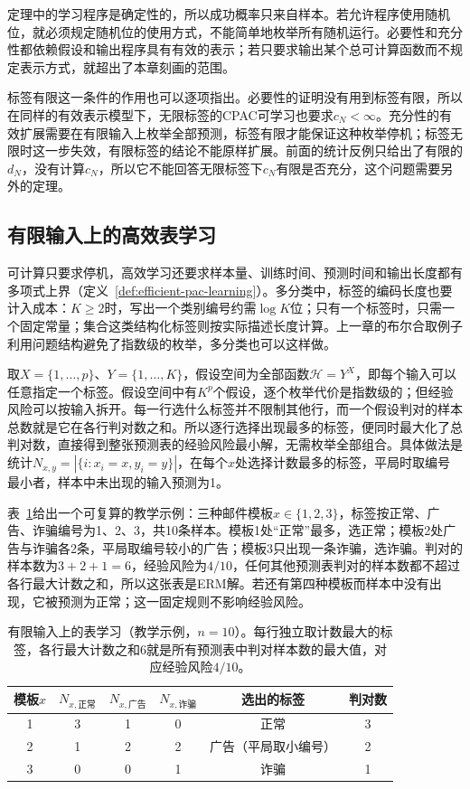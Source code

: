 定理中的学习程序是确定性的，所以成功概率只来自样本。若允许程序使用随机位，就必须规定随机位的使用方式，不能简单地枚举所有随机运行。必要性和充分性都依赖假设和输出程序具有有效的表示；若只要求输出某个总可计算函数而不规定表示方式，就超出了本章刻画的范围。

标签有限这一条件的作用也可以逐项指出。必要性的证明没有用到标签有限，所以在同样的有效表示模型下，无限标签的CPAC可学习也要求$c_N<\infty$。充分性的有效扩展需要在有限输入上枚举全部预测，标签有限才能保证这种枚举停机；标签无限时这一步失效，有限标签的结论不能原样扩展。前面的统计反例只给出了有限的$d_N$，没有计算$c_N$，所以它不能回答无限标签下$c_N$有限是否充分，这个问题需要另外的定理。

\subsection{有限输入上的高效表学习}
\label{sec:lt6-efficient-table-learning}

可计算只要求停机，高效学习还要求样本量、训练时间、预测时间和输出长度都有多项式上界（定义~\ref{def:efficient-pac-learning}）。多分类中，标签的编码长度也要计入成本：$K\geq2$时，写出一个类别编号约需$\log K$位；只有一个标签时，只需一个固定常量；集合这类结构化标签则按实际描述长度计算。上一章的布尔合取例子利用问题结构避免了指数级的枚举，多分类也可以这样做。

取$X=\{1,\ldots,p\}$、$Y=\{1,\ldots,K\}$，假设空间为全部函数$\mathcal H=Y^X$，即每个输入可以任意指定一个标签。假设空间中有$K^p$个假设，逐个枚举代价是指数级的；但经验风险可以按输入拆开。每一行选什么标签并不限制其他行，而一个假设判对的样本总数就是它在各行判对数之和。所以逐行选择出现最多的标签，便同时最大化了总判对数，直接得到整张预测表的经验风险最小解，无需枚举全部组合。具体做法是统计$N_{x,y}=|\{i:x_i=x,y_i=y\}|$，在每个$x$处选择计数最多的标签，平局时取编号最小者，样本中未出现的输入预测为1。

表~\ref{tab:lt6-table-erm-counts}给出一个可复算的教学示例：三种邮件模板$x\in\{1,2,3\}$，标签按正常、广告、诈骗编号为1、2、3，共10条样本。模板1处“正常”最多，选正常；模板2处广告与诈骗各2条，平局取编号较小的广告；模板3只出现一条诈骗，选诈骗。判对的样本数为$3+2+1=6$，经验风险为$4/10$，任何其他预测表判对的样本数都不超过各行最大计数之和，所以这张表是ERM解。若还有第四种模板而样本中没有出现，它被预测为正常；这一固定规则不影响经验风险。

\begin{table}[htbp]
  \centering
  \begin{tabular}{cccccc}
    \toprule
    模板$x$ & $N_{x,\text{正常}}$ & $N_{x,\text{广告}}$ & $N_{x,\text{诈骗}}$ & 选出的标签 & 判对数\\
    \midrule
    1 & 3 & 1 & 0 & 正常 & 3\\
    2 & 1 & 2 & 2 & 广告（平局取小编号） & 2\\
    3 & 0 & 0 & 1 & 诈骗 & 1\\
    \bottomrule
  \end{tabular}
  \caption{有限输入上的表学习（教学示例，$n=10$）。每行独立取计数最大的标签，各行最大计数之和$6$就是所有预测表中判对样本数的最大值，对应经验风险$4/10$。}
  \label{tab:lt6-table-erm-counts}
\end{table}

